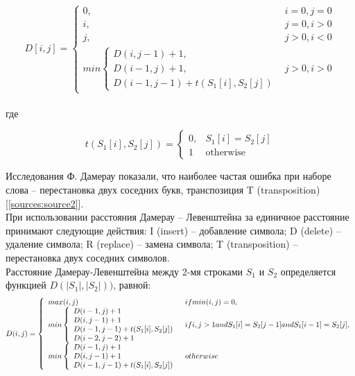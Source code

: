 \documentclass[a4paper,12pt]{article}
\begin{document}
\begin{equation}
D[i,j] = \left\{
\begin{array}{ll}
0, & i = 0, j = 0 \\
i, & j = 0, i > 0 \\
j, & j > 0, i < 0 \\
min\left\{
\begin{array}{ll}
D(i,j - 1) + 1, \\
D(i - 1,j) + 1, \\
D(i - 1,j - 1) + t(S_1[i],S_2[j])
\end{array}
\right.
& j > 0, i > 0
\end{array}
\right.
\end{equation}
\\
где

\begin{equation}
t(S_1[i],S_2[j]) = \left\{
\begin{array}{ll}
0, & S_1[i] = S_2[j] \\
1 & \text{otherwise}
\end{array}
\right.
\end{equation}

Исследования Ф. Дамерау показали, что наиболее частая ошибка при наборе слова – перестановка двух соседних букв, транспозиция T (transposition)[\ref{sources:source2}]. \\
При использовании расстояния Дамерау   –   Левенштейна за единичное расстояние принимают следующие действия: I (insert) – добавление символа;  D  (delete) – удаление символа;  R  (replace) – замена символа;  T  (transposition) – перестановка двух соседних символов.  \\

Расстояние Дамерау-Левенштейна между 2-мя строками $S_1$ и $S_2$ определяется функцией $D(|S_1|,|S_2|))$, равной:
\begin{equation}
D(i,j) = \left\{
\begin{array}{ll}
max(i,j) & if min(i,j) = 0, \\
min\left\{
\begin{array}{l}
D(i-1,j)+1\\
D(i,j-1)+1\\
D(i-1,j-1) + t(S_1[i],S_2[j])\\
D(i-2,j-2) + 1\\
\end{array}
\right. & if i,j>1 and S_1[i]=S_2[j-1] \linebreak and S_1[i-1]=S_2[j], \\
min\left\{
\begin{array}{l}
D(i-1,j)+1\\
D(i,j-1)+1\\
D(i-1,j-1) + t(S_1[i],S_2[j])\\
\end{array}
\right. & otherwise \\
\end{array}
\right.
\end{equation}
\end{document}
